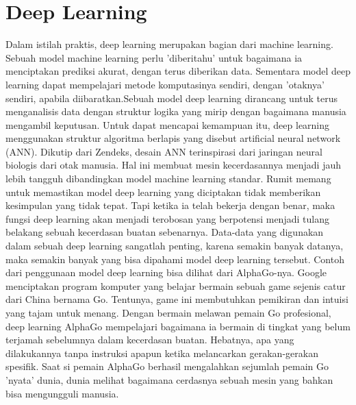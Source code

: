 \section{Deep Learning}
Dalam istilah praktis, deep learning merupakan bagian dari machine learning. Sebuah model machine learning perlu 'diberitahu' untuk bagaimana ia menciptakan prediksi akurat, dengan terus diberikan data. Sementara model deep learning dapat mempelajari metode komputasinya sendiri, dengan 'otaknya' sendiri, apabila diibaratkan.Sebuah model deep learning dirancang untuk terus menganalisis data dengan struktur logika yang mirip dengan bagaimana manusia mengambil keputusan. Untuk dapat mencapai kemampuan itu, deep learning menggunakan struktur algoritma berlapis yang disebut artificial neural network (ANN). Dikutip dari Zendeks, desain ANN terinspirasi dari jaringan neural biologis dari otak manusia. Hal ini membuat mesin kecerdasannya menjadi jauh lebih tangguh dibandingkan model machine learning standar. Rumit memang untuk memastikan model deep learning yang diciptakan tidak memberikan kesimpulan yang tidak tepat. Tapi ketika ia telah bekerja dengan benar, maka fungsi deep learning akan menjadi terobosan yang berpotensi menjadi tulang belakang sebuah kecerdasan buatan sebenarnya. Data-data yang digunakan dalam sebuah deep learning sangatlah penting, karena semakin banyak datanya, maka semakin banyak yang bisa dipahami model deep learning tersebut. Contoh dari penggunaan model deep learning bisa dilihat dari AlphaGo-nya. Google menciptakan program komputer yang belajar bermain sebuah game sejenis catur dari China bernama Go. Tentunya, game ini membutuhkan pemikiran dan intuisi yang tajam untuk menang. Dengan bermain melawan pemain Go profesional, deep learning AlphaGo mempelajari bagaimana ia bermain di tingkat yang belum terjamah sebelumnya dalam kecerdasan buatan. Hebatnya, apa yang dilakukannya tanpa instruksi apapun ketika melancarkan gerakan-gerakan spesifik. Saat si pemain AlphaGo berhasil mengalahkan sejumlah pemain Go 'nyata' dunia, dunia melihat bagaimana cerdasnya sebuah mesin yang bahkan bisa mengungguli manusia.
